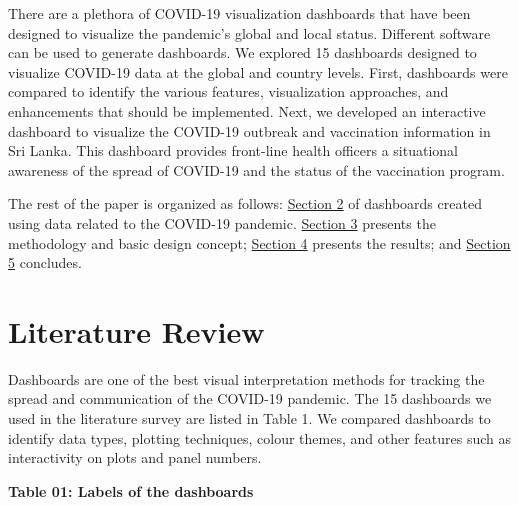\documentclass[
]{article}
\begin{document}
There are a plethora of COVID-19 visualization dashboards that have been
designed to visualize the pandemic's global and local status. Different
software can be used to generate dashboards. We explored 15 dashboards
designed to visualize COVID-19 data at the global and country levels.
First, dashboards were compared to identify the various features,
visualization approaches, and enhancements that should be implemented.
Next, we developed an interactive dashboard to visualize the COVID-19
outbreak and vaccination information in Sri Lanka. This dashboard
provides front-line health officers a situational awareness of the
spread of COVID-19 and the status of the vaccination program.

The rest of the paper is organized as follows:
\protect\hyperlink{litreview}{Section 2} of dashboards created using
data related to the COVID-19 pandemic.
\protect\hyperlink{methods}{Section 3} presents the methodology and
basic design concept; \protect\hyperlink{results}{Section 4} presents
the results; and \protect\hyperlink{ux5cux2520conclusion}{Section 5}
concludes.

\hypertarget{litreview}{%
\section{Literature Review}\label{litreview}}

Dashboards are one of the best visual interpretation methods for
tracking the spread and communication of the COVID-19 pandemic. The 15
dashboards we used in the literature survey are listed in Table 1. We
compared dashboards to identify data types, plotting techniques, colour
themes, and other features such as interactivity on plots and panel
numbers.

\textbf{Table 01: Labels of the dashboards}
\end{document}
